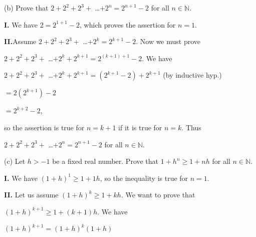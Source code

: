 \documentclass[10pt, twoside, a4paper]{article}
\newcommand*{\field}[1]{\mathbb{#1}}
\numberwithin{equation}{section}
\numberwithin{figure}{section}
\begin{document}
(b) Prove that  $2 + 2^2 + 2^3 +$ \dots $+ 2^n = 2^{n+1} - 2 $ for all $n \in \field{N}$. \vspace{0.2cm}

\hspace{2cm} \textbf{I.} We have $2 = 2^{1+1} -2$, which proves the assertion for $n=1$. \vspace{0.2cm}

\hspace{2cm} \textbf{II.}Assume  $2 + 2^2 + 2^3 +$ \dots $+ 2^k = 2^{k+1} - 2 $. Now we must prove \vspace{0.2cm}

$2 + 2^2 + 2^3 +$ \dots $+ 2^k + 2^{k+1} = 2^{(k+1)+1} -2$. We have \vspace{0.2cm}

\hspace{2cm} $2 + 2^2 + 2^3 +$ \dots $+ 2^k + 2^{k+1} = (2^{k+1} -2) + 2^{k+1} $     (by inductive hyp.)  \vspace{0.2cm}

\hspace{2cm} $= 2(2^{k+1}) - 2$ \vspace{0.2cm}

\hspace{2cm} $= 2^{k+2} - 2$, \vspace{0.2cm} 

so the assertion is true for $n = k+1$ if it is true for $n = k$. Thus \vspace{0.2cm}

\hspace{2cm} $2 + 2^2 + 2^3 +$ \dots $+ 2^n = 2^{n+1} - 2 $ for all $n \in \field{N}$.  \vspace{0.2cm}

(c) Let $h > -1$ be a fixed real number. Prove that ${1+h}^n \ge 1+nh$ for all $n \in \field{N}$.  \vspace{0.2cm}

\hspace{2cm} \textbf{I.}  We have ${(1+h)}^1 \ge 1+1h$, so the inequality is true for $n=1$. \vspace{0.2cm}

\hspace{2cm} \textbf{II.} Let us assume ${(1+h)}^k \ge 1+kh$. We want to prove that \vspace{0.2cm}

${(1+h)}^{k+1} \ge 1+ (k+1)h$. We have \vspace{0.2cm}

\hspace{1cm} ${(1+h)}^{k+1} = {(1+h)}^k(1+h) $ \vspace{0.2cm}
\end{document}
